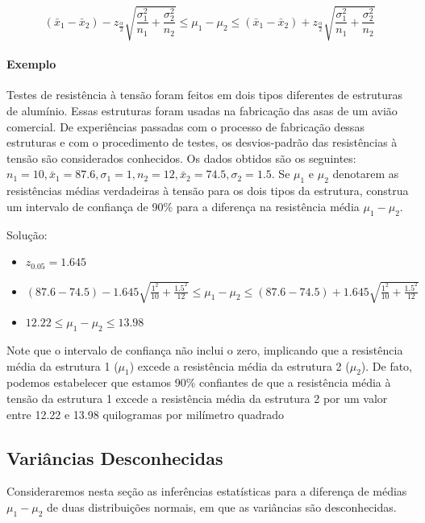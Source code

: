 \documentclass[
]{book}
\providecommand{\tightlist}{%
  \setlength{\itemsep}{0pt}\setlength{\parskip}{0pt}}
\begin{document}
\[(\bar x_1-\bar x_2) -z_{\frac{\alpha}{2}}\sqrt{\frac{\sigma^2_1}{n_1}+\frac{\sigma^2_2}{n_2}}\leq \mu_1-\mu_2 \leq (\bar x_1-\bar x_2) +z_{\frac{\alpha}{2}}\sqrt{\frac{\sigma^2_1}{n_1}+\frac{\sigma^2_2}{n_2}}\]

\hypertarget{exemplo-10}{%
\paragraph{Exemplo}\label{exemplo-10}}

Testes de resistência à tensão foram feitos em dois tipos diferentes de estruturas de alumínio. Essas estruturas foram usadas na fabricação das asas de um avião comercial. De experiências passadas com o processo de fabricação dessas estruturas e com o procedimento de testes, os desvios-padrão das resistências à tensão são considerados conhecidos. Os dados obtidos são os seguintes: \(n_1=10, \bar x_1=87.6, \sigma_1=1, n_2=12, \bar x_2=74.5, \sigma_2=1.5\). Se \(\mu_1\) e \(\mu_2\) denotarem as resistências médias verdadeiras à tensão para os dois tipos da estrutura, construa um intervalo de confiança de 90\% para a diferença na resistência média \(\mu_1-\mu_2\).

Solução:

\begin{itemize}
\tightlist
\item
  \(z_{0.05}=1.645\)
\item
  \((87.6-74.5) -1.645\sqrt{\frac{1^2}{10}+\frac{1.5^2}{12}}\leq \mu_1-\mu_2 \leq (87.6-74.5)+1.645\sqrt{\frac{1^2}{10}+\frac{1.5^2}{12}}\)
\item
  \(12.22 \leq \mu_1-\mu_2 \leq 13.98\)
\end{itemize}

Note que o intervalo de confiança não inclui o zero, implicando que a resistência média da estrutura 1 (\(\mu_1\)) excede a resistência média da estrutura 2 (\(\mu_2\)). De fato, podemos estabelecer que estamos 90\% confiantes de que a resistência média à tensão da estrutura 1 excede a resistência média da estrutura 2 por um valor entre 12.22 e 13.98 quilogramas por milímetro quadrado

\hypertarget{variuxe2ncias-desconhecidas}{%
\subsection{Variâncias Desconhecidas}\label{variuxe2ncias-desconhecidas}}

Consideraremos nesta seção as inferências estatísticas para a diferença de médias \(\mu_1-\mu_2\) de duas distribuições normais, em que as variâncias são desconhecidas.
\end{document}
